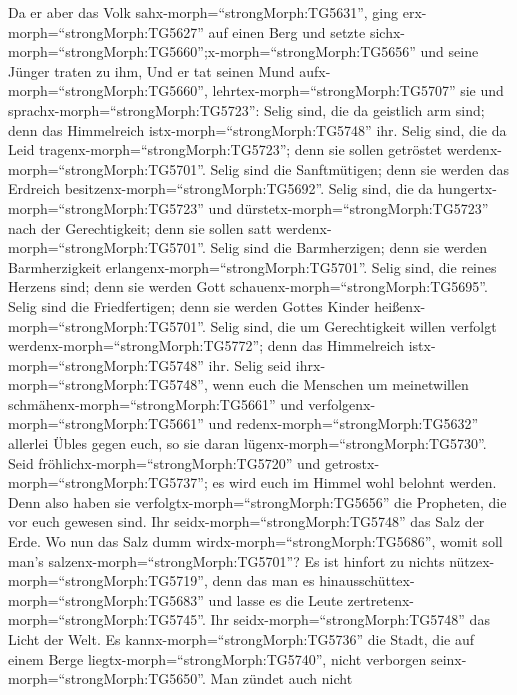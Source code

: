  Da er aber das Volk sahx-morph=``strongMorph:TG5631'', ging
erx-morph=``strongMorph:TG5627'' auf einen Berg und setzte
sichx-morph=``strongMorph:TG5660'';x-morph=``strongMorph:TG5656'' und
seine Jünger traten zu ihm,  Und er tat seinen Mund
aufx-morph=``strongMorph:TG5660'', lehrtex-morph=``strongMorph:TG5707''
sie und sprachx-morph=``strongMorph:TG5723'':  Selig sind,
die da geistlich arm sind; denn das Himmelreich
istx-morph=``strongMorph:TG5748'' ihr.  Selig sind, die da
Leid tragenx-morph=``strongMorph:TG5723''; denn sie sollen getröstet
werdenx-morph=``strongMorph:TG5701''.  Selig sind die
Sanftmütigen; denn sie werden das Erdreich
besitzenx-morph=``strongMorph:TG5692''.  Selig sind, die da
hungertx-morph=``strongMorph:TG5723'' und
dürstetx-morph=``strongMorph:TG5723'' nach der Gerechtigkeit; denn sie
sollen satt werdenx-morph=``strongMorph:TG5701''.  Selig
sind die Barmherzigen; denn sie werden Barmherzigkeit
erlangenx-morph=``strongMorph:TG5701''.  Selig sind, die
reines Herzens sind; denn sie werden Gott
schauenx-morph=``strongMorph:TG5695''.  Selig sind die
Friedfertigen; denn sie werden Gottes Kinder
heißenx-morph=``strongMorph:TG5701''.  Selig sind, die um
Gerechtigkeit willen verfolgt werdenx-morph=``strongMorph:TG5772''; denn
das Himmelreich istx-morph=``strongMorph:TG5748'' ihr. 
Selig seid ihrx-morph=``strongMorph:TG5748'', wenn euch die Menschen um
meinetwillen schmähenx-morph=``strongMorph:TG5661'' und
verfolgenx-morph=``strongMorph:TG5661'' und
redenx-morph=``strongMorph:TG5632'' allerlei Übles gegen euch, so sie
daran lügenx-morph=``strongMorph:TG5730''.  Seid
fröhlichx-morph=``strongMorph:TG5720'' und
getrostx-morph=``strongMorph:TG5737''; es wird euch im Himmel wohl
belohnt werden. Denn also haben sie
verfolgtx-morph=``strongMorph:TG5656'' die Propheten, die vor euch
gewesen sind.  Ihr seidx-morph=``strongMorph:TG5748'' das
Salz der Erde. Wo nun das Salz dumm wirdx-morph=``strongMorph:TG5686'',
womit soll man's salzenx-morph=``strongMorph:TG5701''? Es ist hinfort zu
nichts nützex-morph=``strongMorph:TG5719'', denn das man es
hinausschüttex-morph=``strongMorph:TG5683'' und lasse es die Leute
zertretenx-morph=``strongMorph:TG5745''.  Ihr
seidx-morph=``strongMorph:TG5748'' das Licht der Welt. Es
kannx-morph=``strongMorph:TG5736'' die Stadt, die auf einem Berge
liegtx-morph=``strongMorph:TG5740'', nicht verborgen
seinx-morph=``strongMorph:TG5650''.  Man zündet auch nicht
